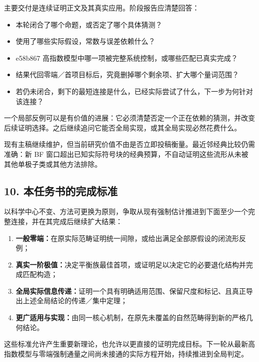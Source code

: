 \documentclass[
  10pt,
]{article}
\providecommand{\tightlist}{%
  \setlength{\itemsep}{0pt}\setlength{\parskip}{0pt}}
\begin{document}
主要交付是连续证明正文及其真实应用。阶段报告应清楚回答：

\begin{itemize}
\tightlist
\item
  本轮闭合了哪个命题，或否定了哪个具体猜测？
\item
  使用了哪些实际假设，常数与误差依赖什么？
\item
  e58b867 高指数模型中哪一项被完整系统控制，或哪些匹配已真实完成？
\item
  结果代回零端／首项目标后，究竟删掉哪个剩余项、扩大哪个量词范围？
\item
  若仍未闭合，剩下的最短连接是什么，已经实际尝试了什么，下一步为何针对该连接？
\end{itemize}

一个局部反例可以是有价值的进展：它必须清楚否定一个正在依赖的猜测，并改变后续证明选择。之后继续追问它能否全局实现，或其全局实现必然花费什么。

现有主稿继续维护，但当前研究价值不由是否立即投稿衡量。最近邻经典比较仍需准确：新
BF
窗口超出已知实际符号块的经典预算，不自动证明这些流形从未被其他单极子类或其他方法排除。

\hypertarget{ux672cux4efbux52a1ux4e66ux7684ux5b8cux6210ux6807ux51c6}{%
\subsection{10.
本任务书的完成标准}\label{ux672cux4efbux52a1ux4e66ux7684ux5b8cux6210ux6807ux51c6}}

以科学中心不变、方法可更换为原则，争取从现有强制估计推进到下面至少一个完整连接，并在其完成后继续扩大结果：

\begin{enumerate}
\def\labelenumi{\arabic{enumi}.}
\tightlist
\item
  \textbf{一般零端：}在原实际范畴证明统一间隙，或给出满足全部原假设的闭流形反例；
\item
  \textbf{真实一阶极值：}决定平衡族最佳首项，或证明足以决定它的必要退化结构并完成匹配构造；
\item
  \textbf{全局实际信息传递：}证明一个具有明确适用范围、保留尺度和标记、且真正导出上述全局结论的传递／集中定理；
\item
  \textbf{更广适用与实现：}由同一核心机制，在原先未覆盖的自然范畴得到新的严格几何结论。
\end{enumerate}

这些标准允许产生重要新理论，也允许以更直接的证明完成目标。下一轮从最新高指数模型与零端强制通量之间尚未接通的实际方程开始，持续推进到全局判定。
\end{document}
